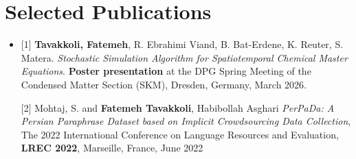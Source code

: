 \documentclass[A4,11pt]{article}
\makeatletter
\newcommand{\CVItem}[1]{
  \item\small{
    {#1 \vspace{-2pt}}
  }
}
\newcommand{\CVSubheading}[4]{
  \vspace{-2pt}\item
    \begin{tabular*}{0.97\textwidth}[t]{l@{\extracolsep{\fill}}r}
      \textbf{#1} & #2 \\
      \small#3 & \small #4 \\
    \end{tabular*}\vspace{-7pt}
}
\newcommand{\CVSubHeadingListStart}{\begin{itemize}[leftmargin=0.5cm, label={}]}
\newcommand{\CVItemListStart}{\begin{itemize}}
\makeatother
\begin{document}
\section{Selected Publications}
 \begin{itemize}[leftmargin=0.5cm, label={}]
    \item {\small


     [1] \textbf{Tavakkoli, Fatemeh}, R. Ebrahimi Viand, B. Bat-Erdene, K. Reuter, S. Matera. 
    \textit{Stochastic Simulation Algorithm for Spatiotemporal Chemical Master Equations}. 
    \textbf{Poster presentation} at the DPG Spring Meeting of the Condensed Matter Section (SKM), 
    Dresden, Germany, March 2026.


    
     $[$2$]$ Mohtaj,  S. and \textbf{Fatemeh Tavakkoli}, Habibollah Asghari  \textit{PerPaDa: A Persian Paraphrase Dataset based on Implicit Crowdsourcing Data Collection}, The 2022 International Conference on Language Resources and Evaluation, \textbf{LREC 2022}, Marseille, France, June 2022\\ \vspace{4pt}}



 \end{itemize}






      
\end{document}
